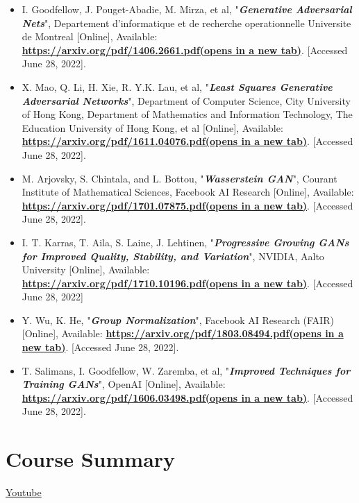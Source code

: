 \begin{itemize}
    \item I. Goodfellow, J. Pouget-Abadie, M. Mirza, et al, "\textit{\textbf{Generative Adversarial Nets}}", Departement d’informatique et de recherche operationnelle Universite de Montreal [Online], Available: \href{https://arxiv.org/pdf/1406.2661.pdf}{\textbf{https://arxiv.org/pdf/1406.2661.pdf(opens in a new tab)}}. [Accessed June 28, 2022].
    \item X. Mao, Q. Li, H. Xie, R. Y.K. Lau, et al, "\textit{\textbf{Least Squares Generative Adversarial Networks}}", Department of Computer Science, City University of Hong Kong, Department of Mathematics and Information Technology, The Education University of Hong Kong, et al [Online], Available: \href{https://arxiv.org/pdf/1611.04076.pdf}{\textbf{https://arxiv.org/pdf/1611.04076.pdf(opens in a new tab)}}. [Accessed June 28, 2022].
    \item M. Arjovsky, S. Chintala, and L. Bottou, "\textit{\textbf{Wasserstein GAN}}", Courant Institute of Mathematical Sciences, Facebook AI Research [Online], Available: \href{https://arxiv.org/pdf/1701.07875.pdf}{\textbf{https://arxiv.org/pdf/1701.07875.pdf(opens in a new tab)}}. [Accessed June 28, 2022].
    \item I. T. Karras, T. Aila, S. Laine, J. Lehtinen, "\textit{\textbf{Progressive Growing GANs for Improved Quality, Stability, and Variation}}", NVIDIA, Aalto University [Online], Available: \href{https://arxiv.org/pdf/1710.10196.pdf}{\textbf{https://arxiv.org/pdf/1710.10196.pdf(opens in a new tab)}}. [Accessed June 28, 2022]
    \item Y. Wu, K. He, "\textit{\textbf{Group Normalization}}", Facebook AI Research (FAIR) [Online], Available: \href{https://arxiv.org/pdf/1803.08494.pdf}{\textbf{https://arxiv.org/pdf/1803.08494.pdf(opens in a new tab)}}. [Accessed June 28, 2022].
    \item T. Salimans, I. Goodfellow, W. Zaremba, et al, "\textit{\textbf{Improved Techniques for Training GANs}}", OpenAI [Online], Available: \href{https://arxiv.org/pdf/1606.03498.pdf}{\textbf{https://arxiv.org/pdf/1606.03498.pdf(opens in a new tab)}}. [Accessed June 28, 2022].
\end{itemize}

\section{Course Summary}
\href{https://www.youtube.com/watch?v=1R5JD_I3m0w}{Youtube} \newline

